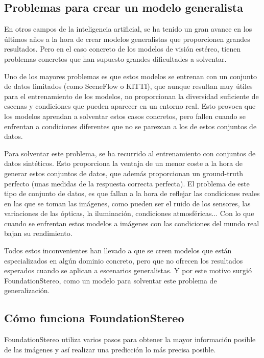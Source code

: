 
\subsection{Problemas para crear un modelo generalista}
En otros campos de la inteligencia artificial, se ha tenido un gran avance en los últimos años a la hora de crear modelos generalistas que proporcionen grandes resultados. Pero en el caso concreto de los modelos de visión estéreo, tienen problemas concretos que han supuesto grandes dificultades a solventar.

Uno de los mayores problemas es que estos modelos se entrenan con un conjunto de datos limitados (como SceneFlow o KITTI), que aunque resultan muy útiles para el entrenamiento de los modelos, no proporcionan la diversidad suficiente de escenas y condiciones que pueden aparecer en un entorno real. Esto provoca que los modelos aprendan a solventar estos casos concretos, pero fallen cuando se enfrentan a condiciones diferentes que no se parezcan a los de estos conjuntos de datos.

Para solventar este problema, se ha recurrido al entrenamiento con conjuntos de datos sintéticos. Esto proporciona la ventaja de un menor coste a la hora de generar estos conjuntos de datos, que además proporcionan un ground-truth perfecto (unas medidas de la respuesta correcta perfecta). El problema de este tipo de conjunto de datos, es que fallan a la hora de reflejar las condiciones reales en las que se toman las imágenes, como pueden ser el ruido de los sensores, las variaciones de las ópticas, la iluminación, condiciones atmosféricas... Con lo que cuando se enfrentan estos modelos a imágenes con las condiciones del mundo real bajan su rendimiento.

Todos estos inconvenientes han llevado a que se creen modelos que están especializados en algún dominio concreto, pero que no ofrecen los resultados esperados cuando se aplican a escenarios generalistas. Y por este motivo surgió FoundationStereo, como un modelo para solventar este problema de generalización.

\subsection{Cómo funciona FoundationStereo}
FoundationStereo utiliza varios pasos para obtener la mayor información posible de las imágenes y así realizar una predicción lo más precisa posible.

